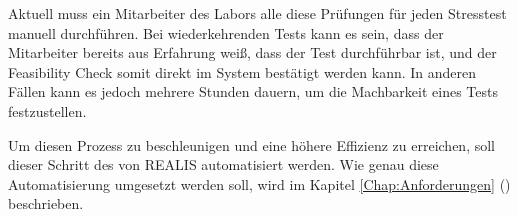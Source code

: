 Aktuell muss ein Mitarbeiter des Labors alle diese Prüfungen für jeden Stresstest manuell durchführen. Bei wiederkehrenden Tests kann es sein, dass der Mitarbeiter bereits aus Erfahrung weiß, dass der Test durchführbar ist, und der Feasibility Check somit direkt im System bestätigt werden kann. In anderen Fällen kann es jedoch mehrere Stunden dauern, um die Machbarkeit eines Tests festzustellen.

Um diesen Prozess zu beschleunigen und eine höhere Effizienz zu erreichen, soll dieser Schritt des  von \gls{REALIS} automatisiert werden. Wie genau diese Automatisierung umgesetzt werden soll, wird im Kapitel \ref{Chap:Anforderungen} () beschrieben.
